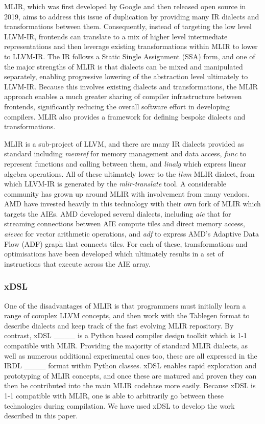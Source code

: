 MLIR, which was first developed by Google and then released open source in 2019, aims to address this issue of duplication by providing many IR dialects and transformations between them. Consequently, instead of targeting the low level LLVM-IR, frontends can translate to a mix of higher level intermediate representations and then leverage existing transformations within MLIR to lower to LLVM-IR. The IR follows a Static Single Assignment (SSA) form, and one of the major strengths of MLIR is that dialects can be mixed and manipulated separately, enabling progressive lowering of the abstraction level ultimately to LLVM-IR.  Because this involves existing dialects and transformations, the MLIR approach enables a much greater sharing of compiler infrastructure between frontends, significantly reducing the overall software effort in developing compilers. MLIR also provides a framework for defining bespoke dialects and transformations. 

MLIR is a sub-project of LLVM, and there are many IR dialects provided as standard including \emph{memref} for memory management and data access, \emph{func} to represent functions and calling between them, and \emph{linalg} which express linear algebra operations. All of these ultimately lower to the \emph{llvm} MLIR dialect, from which LLVM-IR is generated by the \emph{mlir-translate} tool. A considerable community has grown up around MLIR with involvement from many vendors. AMD have invested heavily in this technology with their own fork of MLIR which targets the AIEs. AMD developed several dialects, including \emph{aie} that for streaming connections between AIE compute tiles and direct memory access, \emph{aievec} for vector arithmetic operations, and \emph{adf} to express AMD's Adaptive Data Flow (ADF) graph that connects tiles. For each of these, transformations and optimisations have been developed which ultimately results in a set of instructions that execute across the AIE array.

\subsubsection{xDSL}

One of the disadvantages of MLIR is that programmers must initially learn a range of complex LLVM concepts, and then work with the Tablegen format to describe dialects and keep track of the fast evolving MLIR repository. By contrast, xDSL ____ is a Python based compiler design toolkit which is 1-1 compatible with MLIR. Providing the majority of standard MLIR dialects, as well as numerous additional experimental ones too, these are all expressed in the IRDL ____ format within Python classes. xDSL enables rapid exploration and prototyping of MLIR concepts, and once these are matured and proven they can then be contributed into the main MLIR codebase  more easily. Because xDSL is 1-1 compatible with MLIR, one is able to arbitrarily go between these technologies during compilation. We have used xDSL to develop the work described in this paper.

